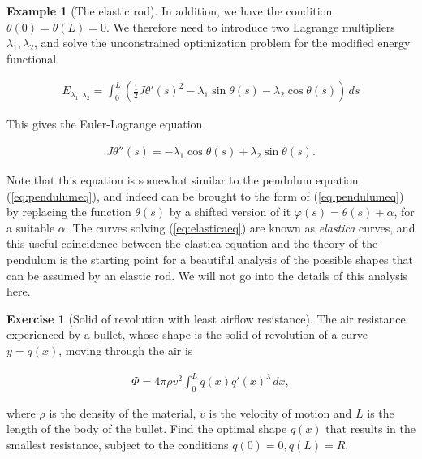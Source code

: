 \documentclass[11pt]{report}
\theoremstyle{plain}
\theoremstyle{definition}
\newtheorem{example}[thm]{Example}
\newtheorem{xexercise}[thm]{Exercise}
\begin{document}
\begin{example}[The elastic rod]
In addition, we have the condition
$\theta(0)=\theta(L)=0$. We therefore need to
introduce two Lagrange multipliers
$\lambda_1, \lambda_2$, and solve the unconstrained
optimization problem for the modified energy
functional

\begin{align*}
E_{\lambda_1, \lambda_2} = \int_0^L \left(\tfrac12 J \theta'(s)^2 - \lambda_1 \sin\theta(s) - \lambda_2 \cos\theta(s)\right)\,ds
\end{align*}

This gives the Euler-Lagrange equation

\begin{equation*} \tag{17}\label{eq:elasticaeq}
\begin{split}
J \theta''(s) = -\lambda_1 \cos \theta(s) + \lambda_2 \sin\theta(s).
\end{split}
\end{equation*}

Note that this equation is somewhat similar to the
pendulum equation (\ref{eq:pendulumeq}), and indeed can be
brought to the form of (\ref{eq:pendulumeq}) by replacing
the function $\theta(s)$ by a shifted version of it
$\varphi(s)=\theta(s)+\alpha$, for a suitable
$\alpha$. The curves solving (\ref{eq:elasticaeq}) are
known as \emph{elastica} curves, and this useful
coincidence between the elastica equation and the
theory of the pendulum is the starting point for a
beautiful analysis of the possible shapes that can be
assumed by an elastic rod. We will not go into the
details of this analysis here.
\end{example}

\begin{xexercise}[Solid of revolution with least airflow resistance]
The air resistance experienced by a bullet, whose
shape is the solid of revolution of a curve $y=q(x)$,
moving through the air is

\begin{align*}
\Phi = 4\pi \rho v^2 \int_0^L q(x) q'(x)^3\,dx,
\end{align*}

where $\rho$ is the density of the material, $v$ is
the velocity of motion and $L$ is the length of the
body of the bullet. Find the optimal shape $q(x)$
that results in the smallest resistance, subject to
the conditions $q(0)=0, q(L)=R$.
\end{xexercise}
\end{document}
